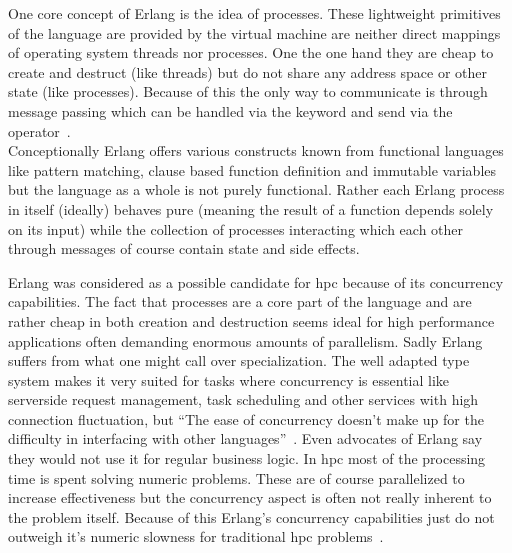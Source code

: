 One core concept of Erlang is the idea of processes. These lightweight primitives of the language are provided by the virtual machine are neither direct mappings of operating system threads nor processes. One the one hand they are cheap to create and destruct (like threads) but do not share any address space or other state (like processes). Because of this the only way to communicate is through message passing which can be handled via the  keyword and send via the \mdinline{!} operator~\cite{erlang_phd, intro_erlang}.
\\


Conceptionally Erlang offers various constructs known from functional languages like pattern matching, clause based function definition and immutable variables but the language as a whole is not purely functional. Rather each Erlang process in itself (ideally) behaves pure (meaning the result of a function depends solely on its input) while the collection of processes interacting which each other through messages of course contain state and side effects.

Erlang was considered as a possible candidate for \gls{hpc} because of its concurrency capabilities. The fact that processes are a core part of the language and are rather cheap in both creation and destruction seems ideal for high performance applications often demanding enormous amounts of parallelism. Sadly Erlang suffers from what one might call over specialization. The well adapted type system makes it very suited for tasks where concurrency is essential like serverside request management, task scheduling and other services with high connection fluctuation, but ``The ease of concurrency doesn’t make up for the difficulty in interfacing with other languages''~\cite{erlang_fps}. Even advocates of Erlang say they would not use it for regular business logic. In \gls{hpc} most of the processing time is spent solving numeric problems. These are of course parallelized to increase effectiveness but the concurrency aspect is often not really inherent to the problem itself. Because of this Erlang's concurrency capabilities just do not outweigh it's numeric slowness for traditional \gls{hpc} problems~\cite{erlang_guide}.

%
%


